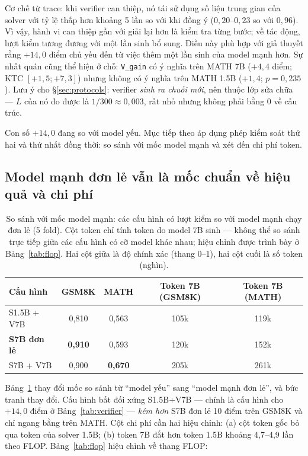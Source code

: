 \documentclass[11pt,a4paper]{article}
\begin{document}
Cơ chế từ trace: khi verifier can thiệp, nó tái sử dụng số liệu trung gian của solver với tỷ lệ thấp hơn khoảng 5 lần so với khi đồng ý ($0{,}20$--$0{,}23$ so với $0{,}96$). Vì vậy, hành vi can thiệp gần với giải lại hơn là kiểm tra từng bước; về tác động, lượt kiểm tương đương với một lần sinh bổ sung. Điều này phù hợp với giả thuyết rằng $+14{,}0$ điểm chủ yếu đến từ việc thêm một lần sinh của model mạnh hơn. Sự nhất quán cũng thể hiện ở chỗ: \texttt{V\_gain} có ý nghĩa trên MATH 7B ($+4{,}4$ điểm; KTC $[+1{,}5;+7{,}3]$) nhưng không có ý nghĩa trên MATH 1.5B ($+1{,}4$; $p=0{,}235$). Lưu ý cho \S\ref{sec:protocols}: verifier \emph{sinh ra chuỗi mới}, nên thuộc lớp sửa chữa --- $L$ của nó đo được là $1/300 \approx 0{,}003$, rất nhỏ nhưng không phải bằng 0 về cấu trúc.

Con số $+14{,}0$ đang so với model yếu. Mục tiếp theo áp dụng phép kiểm soát thứ hai và thứ nhất đồng thời: so sánh với mốc model mạnh và xét đến chi phí token.

\subsection{Model mạnh đơn lẻ vẫn là mốc chuẩn về hiệu quả và chi phí}\label{sec:baseline}

\begin{table}[h]\centering\small
\begin{tabular}{@{}l c c c c@{}}
\toprule
Cấu hình & GSM8K & MATH & Token 7B (GSM8K) & Token 7B (MATH)\\
\midrule
S1.5B + V7B & 0,810 & 0,563 & 105k & 119k\\
\textbf{S7B đơn lẻ} & \textbf{0,910} & 0,593 & 120k & 152k\\
S7B + V7B & 0,900 & \textbf{0,670} & 205k & 261k\\
\bottomrule
\end{tabular}
\caption{So sánh với mốc model mạnh: các cấu hình có lượt kiểm so với model mạnh chạy đơn lẻ (5 fold). Cột token chỉ tính token do model 7B sinh --- không thể so sánh trực tiếp giữa các cấu hình có cỡ model khác nhau; hiệu chỉnh được trình bày ở Bảng~\ref{tab:flop}. Hai cột giữa là độ chính xác (thang 0--1), hai cột cuối là số token (nghìn).}
\label{tab:baseline}
\end{table}

Bảng~\ref{tab:baseline} thay đổi mốc so sánh từ ``model yếu'' sang ``model mạnh đơn lẻ'', và bức tranh thay đổi. Cấu hình bất đối xứng S1.5B+V7B --- chính là cấu hình cho $+14{,}0$ điểm ở Bảng~\ref{tab:verifier} --- \emph{kém hơn} S7B đơn lẻ 10 điểm trên GSM8K và chỉ ngang bằng trên MATH. Cột chi phí cần hai hiệu chỉnh: (a) cột token gốc bỏ qua token của solver 1.5B; (b) token 7B đắt hơn token 1.5B khoảng 4,7--4,9 lần theo FLOP. Bảng~\ref{tab:flop} hiệu chỉnh về thang FLOP:
\end{document}
